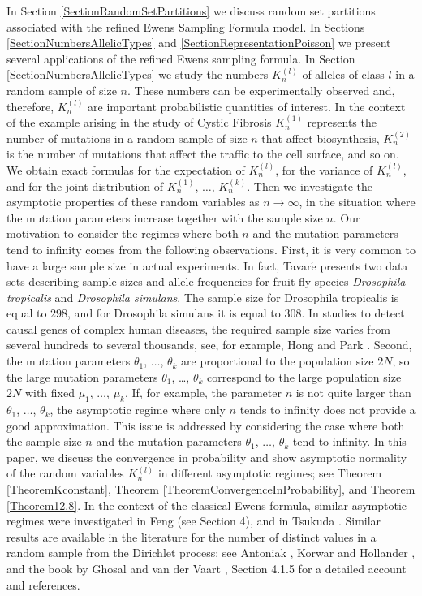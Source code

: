 \documentclass[12pt]{amsart}
\theoremstyle{definition}
\numberwithin{equation}{section}
\begin{document}
In Section \ref{SectionRandomSetPartitions}
we discuss random set partitions associated with
the refined Ewens Sampling Formula model.
In Sections \ref{SectionNumbersAllelicTypes} and
\ref{SectionRepresentationPoisson} we present several applications of the refined Ewens sampling formula.
In Section \ref{SectionNumbersAllelicTypes} we study the numbers $K_n^{(l)}$ of alleles of class $l$
in a random sample of size $n$. These numbers can be experimentally observed and, therefore, $K_n^{(l)}$
are important probabilistic quantities of interest. In the context of the example arising in the study of Cystic Fibrosis  $K_n^{(1)}$ represents the number of mutations in a random sample of size
$n$ that affect biosynthesis, $K_n^{(2)}$ is the number of mutations that affect the traffic to the cell surface, and so on.
We obtain exact formulas for the expectation of $K_n^{(l)}$,
for the variance of $K_n^{(l)}$, and for the joint distribution of $K_n^{(1)}$, $\ldots$, $K_n^{(k)}$. Then we investigate the asymptotic properties of these random variables as $n\rightarrow\infty$, in the situation
where the mutation parameters increase together
with the sample size $n$.
Our motivation to consider the regimes where both $n$ and the mutation parameters tend to infinity comes from the  following observations. First, it is very common to have a large sample size in actual experiments. In fact, Tavar$\acute{\mbox{e}}$ \cite{Tavare} presents two data sets describing sample sizes and allele frequencies
for fruit fly species \textit{Drosophila tropicalis} and \textit{Drosophila simulans}. The sample size for Drosophila tropicalis is equal to $298$, and for Drosophila simulans it is equal to $308$.
 In studies to detect causal genes of complex human diseases, the required sample size varies from several hundreds to several thousands, see, for example, Hong and Park \cite{HongPark}.
Second, the mutation parameters $\theta_1$, $\ldots$, $\theta_k$ are proportional to the population size $2N$, so the large mutation parameters $\theta_1$, \ldots, $\theta_k$
correspond to the large population size $2N$ with fixed $\mu_1$, $\ldots$, $\mu_k$. If, for example,
the parameter $n$ is not quite larger than $\theta_1$, $\ldots$, $\theta_k$, the asymptotic regime where
only $n$ tends to infinity does not provide a good approximation. This issue is addressed
by considering the case where both the sample size $n$ and the mutation parameters $\theta_1$,
$\ldots$, $\theta_k$ tend to infinity.
In this paper, we discuss the convergence
in probability and show asymptotic normality of the random variables $K_n^{(l)}$ in different asymptotic regimes; see Theorem \ref{TheoremKconstant}, Theorem \ref{TheoremConvergenceInProbability}, and
Theorem \ref{Theorem12.8}. In the context of the classical Ewens formula,
similar asymptotic regimes were investigated in Feng \cite{FengL} (see Section 4),  and in Tsukuda \cite{Tsukuda, Tsukuda1}. Similar results are available in the literature for the number of distinct values in a random sample from the Dirichlet process; see Antoniak \cite{Antoniak}, Korwar and Hollander \cite{KorwarHollander}, and the book by Ghosal and van der Vaart \cite{GhosalvanderVaart},
Section 4.1.5 for a detailed account and references.
\end{document}
